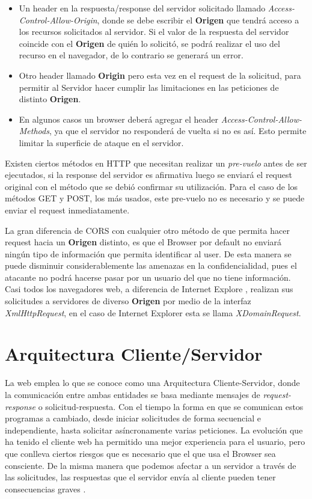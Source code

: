         \begin{itemize}
            \item Un header en la respuesta/response del servidor solicitado llamado \textit{Access-Control-Allow-Origin}, donde se debe escribir el \textbf{Origen} que tendrá acceso a los recursos solicitados al servidor. Si el valor de la respuesta del servidor coincide con el \textbf{Origen} de quién lo solicitó, se podrá realizar el uso del recurso en el navegador, de lo contrario se generará un error.

            \item Otro header llamado \textbf{Origin} pero esta vez en el request de la solicitud, para permitir al Servidor hacer cumplir las limitaciones en las peticiones de distinto \textbf{Origen}.

            \item En algunos casos un browser deberá agregar el header \textit{Access-Control-Allow-Methods}, ya que el servidor no responderá de vuelta si no es así. Esto permite limitar la superficie de ataque en el servidor.

        \end{itemize}
    Existen ciertos métodos en HTTP que necesitan realizar un \textit{pre-vuelo} antes de ser ejecutados, si la response del servidor es afirmativa luego se enviará el request original con el método que se debió confirmar su utilización. Para el caso de los métodos GET y POST, los más usados, este pre-vuelo no es necesario y se puede enviar el request inmediatamente.
    
    La gran diferencia de CORS con cualquier otro método de que permita hacer request hacia un \textbf{Origen} distinto, es que el Browser por default no enviará ningún tipo de información que permita identificar al user. De esta manera se puede disminuir considerablemente las amenazas en la confidencialidad, pues el atacante no podrá hacerse pasar por un usuario del que no tiene información. Casi todos los navegadores web, a diferencia de Internet Explore \cite{bookWebAppSec}, realizan sus solicitudes a servidores de diverso \textbf{Origen} por medio de la interfaz \textit{XmlHttpRequest}, en el caso de Internet Explorer esta se llama \textit{XDomainRequest}.

\section{Arquitectura Cliente/Servidor}
    \label{chap2:ArqCS}
    La web emplea lo que se conoce como una Arquitectura Cliente-Servidor, donde la comunicación entre ambas entidades se basa mediante mensajes de \textit{request-response} o solicitud-respuesta. Con el tiempo la forma en que se comunican estos programas a cambiado, desde iniciar solicitudes de forma secuencial e independiente, hasta solicitar asíncronamente varias peticiones. La evolución que ha tenido el cliente web ha permitido una mejor experiencia para el usuario, pero que conlleva ciertos riesgos que es necesario que el que usa el Browser sea consciente. De la misma manera que podemos afectar a un servidor a través de las solicitudes, las respuestas que el servidor envía al cliente pueden tener consecuencias graves \cite{alcorn2014browser}.


